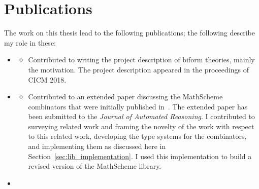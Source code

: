 \section{Publications}
The work on this thesis lead to the following publications; the following describe my role in these:  
\begin{itemize}
    \item \cite{biformCICM2018} 
        \begin{itemize}
        \item[] Contributed to writing the project description of biform theories, mainly the motivation. The project description appeared in the proceedings of CICM 2018. 
        \end{itemize}
    \item \cite{carette2018building} 
    \begin{itemize} 
    \item[] Contributed to an extended paper discussing the MathScheme combinators that were initially published in~\cite{CaretteOConnorTPC}. The extended paper has been submitted to the \textit{Journal of Automated Reasoning}. I contributed to surveying related work and framing the novelty of the work with respect to this related work, developing the type systems for the combinators, and implementing them as discussed here in Section~\ref{sec:lib_implementation}. I used this implementation to build a revised version of the MathScheme library. 
   \end{itemize}
    \item ~\cite{cicm2019diagrams} 
    \begin{itemize}

\end{itemize}
\end{itemize}
